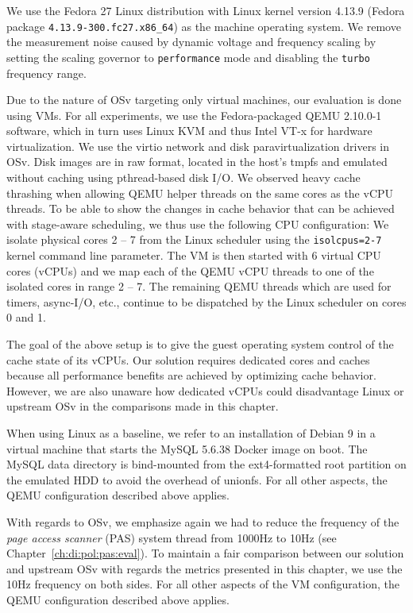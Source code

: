 \documentclass[12pt,a4paper]{book}
\begin{document}
We use the Fedora 27 Linux distribution with Linux kernel version 4.13.9 (Fedora package \lstinline[style=figurecpp]{4.13.9-300.fc27.x86_64}) as the machine operating system.
We remove the measurement noise caused by dynamic voltage and frequency scaling by setting the scaling governor to \texttt{performance} mode and disabling the \texttt{turbo} frequency range.

Due to the nature of OSv targeting only virtual machines, our evaluation is done using VMs.
For all experiments, we use the Fedora-packaged QEMU 2.10.0-1 software, which in turn uses Linux KVM and thus Intel VT-x for hardware virtualization.
We use the virtio network and disk paravirtualization drivers in OSv.
Disk images are in raw format, located in the host's tmpfs and emulated without caching using pthread-based disk I/O.
We observed heavy cache thrashing when allowing QEMU helper threads on the same cores as the vCPU threads.
To be able to show the changes in cache behavior that can be achieved with stage-aware scheduling, we thus use the following CPU configuration:
We isolate physical cores 2 -- 7 from the Linux scheduler using the \lstinline[style=figurecpp]{isolcpus=2-7} kernel command line parameter.
The VM is then started with 6 virtual CPU cores (vCPUs) and we map each of the QEMU vCPU threads to one of the isolated cores in range 2 -- 7.
The remaining QEMU threads which are used for timers, async-I/O, etc., continue to be dispatched by the Linux scheduler on cores 0 and 1.

The goal of the above setup is to give the guest operating system control of the cache state of its vCPUs.
Our solution requires dedicated cores and caches because all performance benefits are achieved by optimizing cache behavior.
However, we are also unaware how dedicated vCPUs could disadvantage Linux or upstream OSv in the comparisons made in this chapter.

When using Linux as a baseline, we refer to an installation of Debian 9 in a virtual machine that starts the MySQL 5.6.38 Docker image on boot.
The MySQL data directory is bind-mounted from the ext4-formatted root partition on the emulated HDD to avoid the overhead of unionfs.
For all other aspects, the QEMU configuration described above applies.

With regards to OSv, we emphasize again we had to reduce the frequency of the \emph{page access scanner} (PAS) system thread from 1000Hz to 10Hz (see Chapter~\ref{ch:di:pol:pas:eval}).
To maintain a fair comparison between our solution and upstream OSv with regards the metrics presented in this chapter, we use the 10Hz frequency on both sides.
For all other aspects of the VM configuration, the QEMU configuration described above applies.
\end{document}
